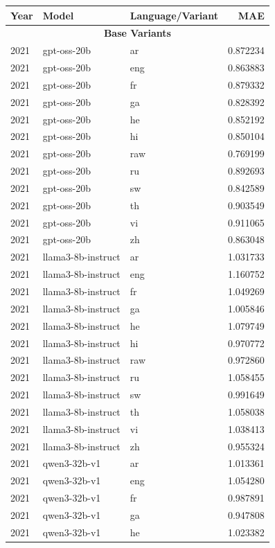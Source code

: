 \begin{tabular}{lllr}
\toprule
Year & Model & Language/Variant & MAE \\
\midrule
\multicolumn{4}{c}{\textbf{Base Variants}} \\
\midrule
2021 & gpt-oss-20b & ar & 0.872234 \\
2021 & gpt-oss-20b & eng & 0.863883 \\
2021 & gpt-oss-20b & fr & 0.879332 \\
2021 & gpt-oss-20b & ga & 0.828392 \\
2021 & gpt-oss-20b & he & 0.852192 \\
2021 & gpt-oss-20b & hi & 0.850104 \\
2021 & gpt-oss-20b & raw & 0.769199 \\
2021 & gpt-oss-20b & ru & 0.892693 \\
2021 & gpt-oss-20b & sw & 0.842589 \\
2021 & gpt-oss-20b & th & 0.903549 \\
2021 & gpt-oss-20b & vi & 0.911065 \\
2021 & gpt-oss-20b & zh & 0.863048 \\
2021 & llama3-8b-instruct & ar & 1.031733 \\
2021 & llama3-8b-instruct & eng & 1.160752 \\
2021 & llama3-8b-instruct & fr & 1.049269 \\
2021 & llama3-8b-instruct & ga & 1.005846 \\
2021 & llama3-8b-instruct & he & 1.079749 \\
2021 & llama3-8b-instruct & hi & 0.970772 \\
2021 & llama3-8b-instruct & raw & 0.972860 \\
2021 & llama3-8b-instruct & ru & 1.058455 \\
2021 & llama3-8b-instruct & sw & 0.991649 \\
2021 & llama3-8b-instruct & th & 1.058038 \\
2021 & llama3-8b-instruct & vi & 1.038413 \\
2021 & llama3-8b-instruct & zh & 0.955324 \\
2021 & qwen3-32b-v1 & ar & 1.013361 \\
2021 & qwen3-32b-v1 & eng & 1.054280 \\
2021 & qwen3-32b-v1 & fr & 0.987891 \\
2021 & qwen3-32b-v1 & ga & 0.947808 \\
2021 & qwen3-32b-v1 & he & 1.023382 \\

\end{tabular}
